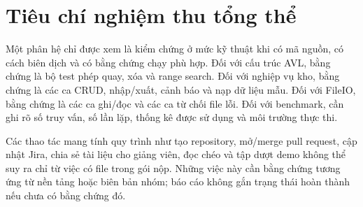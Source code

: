 \section{Tiêu chí nghiệm thu tổng thể}
Một phân hệ chỉ được xem là kiểm chứng ở mức kỹ thuật khi có mã nguồn, có cách biên dịch và có bằng chứng chạy phù hợp. Đối với cấu trúc AVL, bằng chứng là bộ test phép quay, xóa và range search. Đối với nghiệp vụ kho, bằng chứng là các ca CRUD, nhập/xuất, cảnh báo và nạp dữ liệu mẫu. Đối với FileIO, bằng chứng là các ca ghi/đọc và các ca từ chối file lỗi. Đối với benchmark, cần ghi rõ số truy vấn, số lần lặp, thống kê được sử dụng và môi trường thực thi.

Các thao tác mang tính quy trình như tạo repository, mở/merge pull request, cập nhật Jira, chia sẻ tài liệu cho giảng viên, đọc chéo và tập dượt demo không thể suy ra chỉ từ việc có file trong gói nộp. Những việc này cần bằng chứng tương ứng từ nền tảng hoặc biên bản nhóm; báo cáo không gắn trạng thái hoàn thành nếu chưa có bằng chứng đó.

